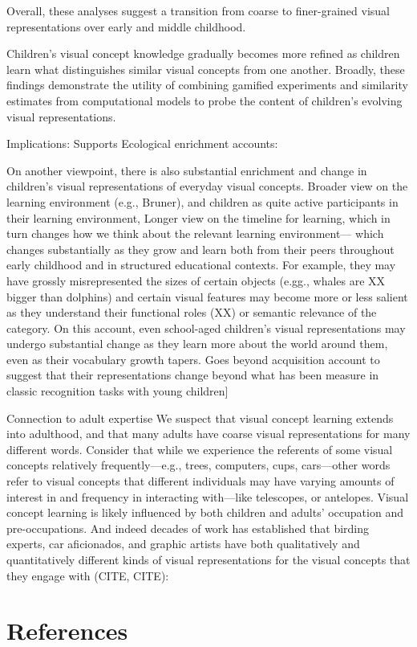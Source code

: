 \documentclass[
  man]{apa6}
\begin{document}
Overall, these analyses suggest a transition from coarse to finer-grained visual representations over early and middle childhood.

Children's visual concept knowledge gradually becomes more refined as children learn what distinguishes similar visual concepts from one another. Broadly, these findings demonstrate the utility of combining gamified experiments and similarity estimates from computational models to probe the content of children's evolving visual representations.

Implications:
Supports Ecological enrichment accounts:

On another viewpoint, there is also substantial enrichment and change in children's visual representations of everyday visual concepts.
Broader view on the learning environment (e.g., Bruner), and children as quite active participants in their learning environment,
Longer view on the timeline for learning, which in turn changes how we think about the relevant learning environment--- which changes substantially as they grow and learn both from their peers throughout early childhood and in structured educational contexts.
For example, they may have grossly misrepresented the sizes of certain objects (e.gg., whales are XX bigger than dolphins) and certain visual features may become more or less salient as they understand their functional roles (XX) or semantic relevance of the category. On this account, even school-aged children's visual representations may undergo substantial change as they learn more about the world around them, even as their vocabulary growth tapers.
Goes beyond acquisition account to suggest that their representations change beyond what has been measure in classic recognition tasks with young children{]}

Connection to adult expertise
We suspect that visual concept learning extends into adulthood, and that many adults have coarse visual representations for many different words. Consider that while we experience the referents of some visual concepts relatively frequently---e.g., trees, computers, cups, cars---other words refer to visual concepts that different individuals may have varying amounts of interest in and frequency in interacting with---like telescopes, or antelopes. Visual concept learning is likely influenced by both children and adults' occupation and pre-occupations. And indeed decades of work has established that birding experts, car aficionados, and graphic artists have both qualitatively and quantitatively different kinds of visual representations for the visual concepts that they engage with (CITE, CITE):

\newpage

\section{References}\label{references}

\label{refs}
\end{document}
